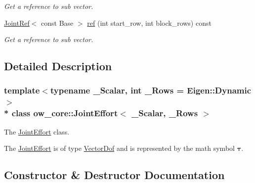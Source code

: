 \begin{DoxyCompactItemize}
\begin{DoxyCompactList}\small\item\em Get a reference to sub vector. \end{DoxyCompactList}\item 
\hyperlink{classow__core_1_1JointRef}{Joint\+Ref}$<$ const Base $>$ \hyperlink{classow__core_1_1JointEffort_a4221879bee2d84d53473a934de1f7f23}{ref} (int start\+\_\+row, int block\+\_\+rows) const \hypertarget{classow__core_1_1JointEffort_a4221879bee2d84d53473a934de1f7f23}{}\label{classow__core_1_1JointEffort_a4221879bee2d84d53473a934de1f7f23}

\begin{DoxyCompactList}\small\item\em Get a reference to sub vector. \end{DoxyCompactList}\end{DoxyCompactItemize}


\subsection{Detailed Description}
\subsubsection*{template$<$typename \+\_\+\+Scalar, int \+\_\+\+Rows = Eigen\+::\+Dynamic$>$\\*
class ow\+\_\+core\+::\+Joint\+Effort$<$ \+\_\+\+Scalar, \+\_\+\+Rows $>$}

The \hyperlink{classow__core_1_1JointEffort}{Joint\+Effort} class. 

The \hyperlink{classow__core_1_1JointEffort}{Joint\+Effort} is of type \hyperlink{classow__core_1_1VectorDof}{Vector\+Dof} and is represented by the math symbol $\mathbf{\tau}$. 

\subsection{Constructor \& Destructor Documentation}
